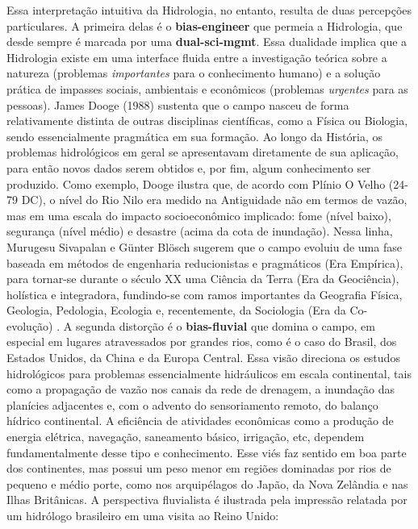 \documentclass[./main.tex]{subfiles}
\begin{document}
\par Essa interpretação intuitiva da Hidrologia, no entanto, resulta de duas percepções particulares. A primeira delas é o \textbf{\gls{bias-engineer}} que permeia a Hidrologia, que desde sempre é marcada por uma \textbf{\gls{dual-sci-mgmt}}. Essa dualidade implica que a Hidrologia existe em uma interface fluida entre a investigação teórica sobre a natureza (problemas \textit{importantes} para o conhecimento humano) e a solução prática de impasses sociais, ambientais e econômicos (problemas \textit{urgentes} para as pessoas). James Dooge (1988) \cite{Dooge1988} sustenta que o campo nasceu de forma relativamente distinta de outras disciplinas científicas, como a Física ou Biologia, sendo essencialmente pragmática em sua formação. Ao longo da História, os problemas hidrológicos em geral se apresentavam diretamente de sua aplicação, para então novos dados serem obtidos e, por fim, algum conhecimento ser produzido. Como exemplo, Dooge ilustra que, de acordo com Plínio O Velho (24-79 DC), o nível do Rio Nilo era medido na Antiguidade não em termos de vazão, mas em uma escala do impacto socioeconômico implicado: fome (nível baixo), segurança (nível médio) e desastre (acima da cota de inundação). Nessa linha, Murugesu Sivapalan e Günter Blösch sugerem que o campo evoluiu de uma fase baseada em métodos de engenharia reducionistas e pragmáticos (Era Empírica), para tornar-se durante o século XX uma Ciência da Terra (Era da Geociência), holística e integradora, fundindo-se com ramos importantes da Geografia Física, Geologia, Pedologia, Ecologia e, recentemente, da Sociologia (Era da Co-evolução) \cite{Sivapalan2017, Sivapalan2018}. A segunda distorção é o \textbf{\gls{bias-fluvial}} que domina o campo, em especial em lugares atravessados por grandes rios, como é o caso do Brasil, dos Estados Unidos, da China e da Europa Central. Essa visão direciona os estudos hidrológicos para problemas essencialmente hidráulicos em escala continental, tais como a propagação de vazão nos canais da rede de drenagem, a inundação das planícies adjacentes e, com o advento do sensoriamento remoto, do balanço hídrico continental. A eficiência de atividades econômicas como a produção de energia elétrica, navegação, saneamento básico, irrigação, etc, dependem fundamentalmente desse tipo e conhecimento. Esse viés faz sentido em boa parte dos continentes, mas possui um peso menor em regiões dominadas por rios de pequeno e médio porte, como nos arquipélagos do Japão, da Nova Zelândia e nas Ilhas Britânicas. A perspectiva fluvialista é ilustrada pela impressão relatada por um hidrólogo brasileiro em uma visita ao Reino Unido:
\end{document}
